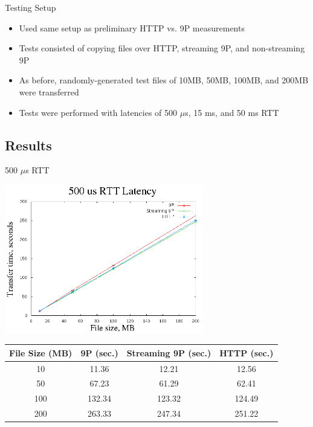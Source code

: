 \documentclass[11pt,compress]{beamer}
\begin{document}
\begin{frame}{Testing Setup}
\begin{itemize}
	\item Used same setup as preliminary HTTP vs. 9P measurements
	\item Tests consisted of copying files over HTTP, streaming 9P, and non-streaming 9P
	\item As before, randomly-generated test files of 10MB, 50MB, 100MB, and 200MB were transferred
	\item Tests were performed with latencies of 500 $\mu$s, 15 ms, and 50 ms RTT
\end{itemize}
\end{frame}

\subsection{Results}

\begin{frame}{500 $\mu$s RTT}
\begin{center}
	\includegraphics[width=0.65\textwidth]{results/500us-stream.png}
	\scriptsize{
	\begin{table}
		\begin{center}
			\begin{tabular}{ | c | c | c | c | }
			\hline
			\bf{File Size (MB)} & \bf{9P (sec.)} & \bf{Streaming 9P (sec.)} & \bf{HTTP (sec.)} \\ \hline
			10 & 11.36 & 12.21 & 12.56 \\ \hline
			50 & 67.23 & 61.29 & 62.41 \\ \hline
			100 & 132.34 & 123.32 & 124.49 \\ \hline
			200 & 263.33 & 247.34 & 251.22 \\ \hline
			\end{tabular}
		\end{center}
	\end{table}
	}
\end{center}
\end{frame}
\end{document}
